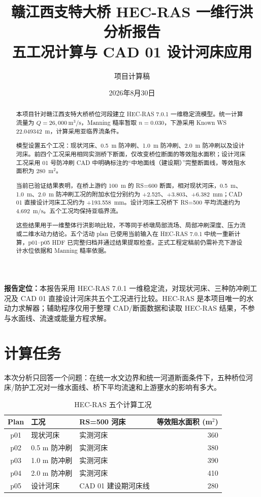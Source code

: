 \documentclass[UTF8,a4paper,12pt]{ctexart}
\title{\bfseries 赣江西支特大桥 HEC-RAS 一维行洪分析报告\\[0.8em]\large 五工况计算与 CAD 01 设计河床应用}
\author{项目计算稿}
\date{2026年8月30日}
\newcommand{\mthreeps}{\mathrm{m^3/s}}
\begin{document}
\maketitle
\thispagestyle{empty}
\vfill
\begin{center}
\begin{minipage}{0.88\textwidth}
\small
\textbf{报告定位：}本报告采用 HEC-RAS 7.0.1 一维稳定流，对现状河床、三种防冲刷工况及 CAD 01 直接设计河床共五个工况进行比较。HEC-RAS 是本项目唯一的水动力求解器；辅助程序仅用于整理 CAD/断面数据和读取 HEC-RAS 结果，不参与水面线、流速或能量方程求解。
\end{minipage}
\end{center}
\vfill
\clearpage

\begin{abstract}
本项目针对赣江西支特大桥桥位河段建立 HEC-RAS 7.0.1 一维稳定流模型。统一计算流量为 $Q=26{,}000\ \mthreeps$，Manning 糙率暂取 $n=0.030$，下游采用 Known WS 22.049342~m，计算采用亚临界流条件。

模型设置五个工况：现状河床、0.5~m 防冲刷、1.0~m 防冲刷、2.0~m 防冲刷以及设计河床。前四个工况采用相同实测桥下断面，仅改变桥位断面的等效阻水面积；设计河床工况采用 01 号防冲刷 CAD 中明确标注的“中地面线（建设期）”完整断面线，等效阻水面积为 280~m$^2$。

当前已验证结果表明，在桥上游约 100~m 的 RS=600 断面，相对现状河床，0.5~m、1.0~m、2.0~m 防冲刷工况的附加水位分别约为 +2.525、+3.803、+6.382~mm；CAD 01 直接设计河床工况约为 +193.558~mm。设计河床工况桥下 RS=500 平均流速约为 4.692~m/s。五个工况均保持亚临界流。

这些结果用于一维整体行洪影响比较，不等同于桥墩局部流场、局部冲刷深度、压力流或二维水动力结论。五个活动 plan 已使用当前输入在 HEC-RAS 7.0.1 中统一重新计算，p01--p05 HDF 已完整归档并通过结果提取检查。正式工程定稿前仍需补充下游设计水位依据和 Manning 糙率依据。
\end{abstract}

\tableofcontents
\clearpage

\section{计算任务}
本次分析只回答一个问题：在统一水文边界和统一河道断面条件下，五种桥位河床/防护工况对一维水面线、桥下平均流速和上游壅水的影响有多大。

\begin{table}[H]
\centering
\caption{HEC-RAS 五个计算工况}
\begin{tabular}{cllr}
\toprule
Plan & 工况 & RS=500 河床 & 等效阻水面积 (m$^2$) \\
\midrule
p01 & 现状河床 & 实测河床 & 360 \\
p02 & 0.5 m 防冲刷 & 实测河床 & 380 \\
p03 & 1.0 m 防冲刷 & 实测河床 & 390 \\
p04 & 2.0 m 防冲刷 & 实测河床 & 410 \\
p05 & 设计河床 & CAD 01 建设期河床线 & 280 \\
\bottomrule
\end{tabular}
\end{table}
\end{document}
